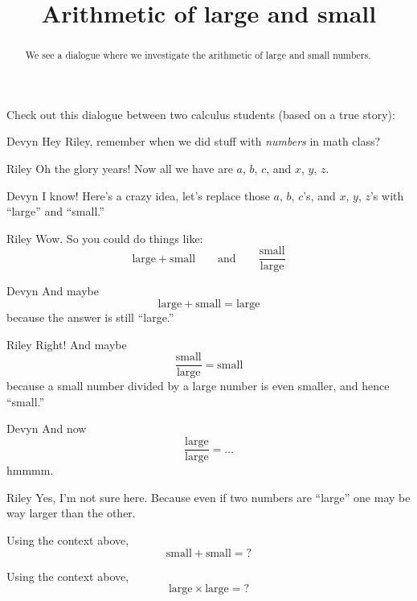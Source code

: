 \documentclass{ximera}
\title[Break-Ground:]{Arithmetic of large and small}
\begin{document}
\begin{abstract}
We see a dialogue where we investigate the arithmetic of large
and small numbers.
\end{abstract}
\maketitle


Check out this dialogue between two calculus students (based on a true
story):

\begin{dialogue}
\item[Devyn] Hey Riley, remember when we did stuff with
  \textit{numbers} in math class?
\item[Riley] Oh the glory years! Now all we have are $a$, $b$, $c$, and $x$, $y$, $z$.
\item[Devyn] I know! Here's a crazy idea, let's replace those $a$,
  $b$, $c$'s, and $x$, $y$, $z$'s with ``large'' and ``small.''
\item[Riley] Wow. So you could do things like:
  \[
  \text{large}+\text{small}\qquad\text{and}\qquad \frac{\text{small}}{\text{large}}
  \]
\item[Devyn] And maybe
  \[
  \text{large}+\text{small} = \text{large}
  \]
  because the answer is still ``large.''
\item[Riley] Right! And maybe
  \[
  \frac{\text{small}}{\text{large}} = \text{small}
  \]
  because a small number divided by a large number is even smaller, and hence ``small.''
\item[Devyn] And now
  \[
  \frac{\text{large}}{\text{large}} = \dots
  \]
  hmmmm.
  \item[Riley] Yes, I'm not sure here. Because even if two numbers are
    ``large'' one may be way larger than the other.
\end{dialogue}



\begin{problem}
  Using the context above, 
  \[
  \text{small}+\text{small} = ?
  \]
  \begin{multipleChoice}
  \end{multipleChoice}
\end{problem}


\begin{problem}
  Using the context above, 
  \[
  \text{large}\times\text{large} = ?
  \]
  \begin{multipleChoice}
  \end{multipleChoice}
\end{problem}
\end{document}
